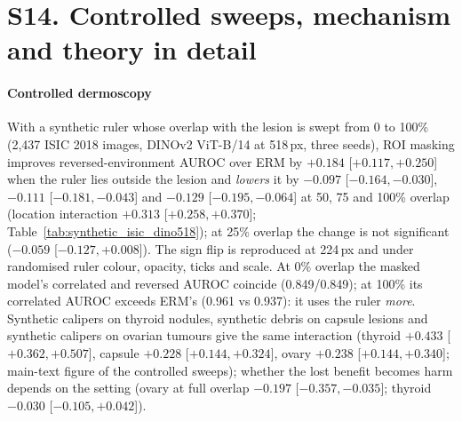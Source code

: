 \section*{S14. Controlled sweeps, mechanism and theory in detail}\label{supp:S14}
\paragraph{Controlled dermoscopy} With a synthetic ruler whose overlap with the lesion is swept from 0 to 100\% (2,437 ISIC 2018 images, DINOv2
ViT-B/14 at 518\,px, three seeds), ROI masking improves reversed-environment AUROC over ERM by $+0.184$
[$+0.117, +0.250$] when the ruler lies outside the lesion and \emph{lowers} it by $-0.097$ [$-0.164, -0.030$],
$-0.111$ [$-0.181, -0.043$] and $-0.129$ [$-0.195, -0.064$] at 50, 75 and 100\% overlap (location interaction
$+0.313$ [$+0.258, +0.370$]; Table~\ref{tab:synthetic_isic_dino518}); at 25\% overlap the change is not significant
($-0.059$ [$-0.127, +0.008$]). The sign flip is reproduced at 224\,px and
under randomised ruler colour, opacity, ticks and scale. At 0\% overlap the masked model's correlated and reversed
AUROC coincide (0.849/0.849); at 100\% its correlated AUROC exceeds ERM's (0.961 vs 0.937): it uses the ruler
\emph{more}. Synthetic calipers on thyroid nodules, synthetic debris on capsule lesions and synthetic calipers on
ovarian tumours give the same interaction (thyroid $+0.433$ [$+0.362, +0.507$], capsule $+0.228$
[$+0.144, +0.324$], ovary $+0.238$ [$+0.144, +0.340$]; main-text figure of the controlled sweeps); whether the lost benefit becomes harm
depends on the setting (ovary at full overlap $-0.197$ [$-0.357, -0.035$]; thyroid $-0.030$ [$-0.105, +0.042$]).


